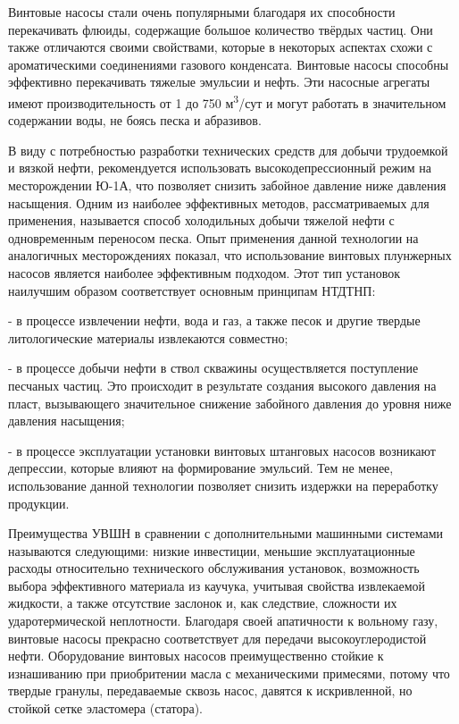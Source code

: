 \begin{multicols}{2}
Винтовые насосы стали очень популярными благодаря их способности
перекачивать флюиды, содержащие большое количество твёрдых частиц. Они
также отличаются своими свойствами, которые в некоторых аспектах схожи с
ароматическими соединениями газового конденсата. Винтовые насосы
способны эффективно перекачивать тяжелые эмульсии и нефть. Эти насосные
агрегаты имеют производительность от 1 до 750 м\textsuperscript{3}/сут и
могут работать в значительном содержании воды, не боясь песка и
абразивов.

В виду с потребностью разработки технических средств для добычи
трудоемкой и вязкой нефти, рекомендуется использовать
высокодепрессионный режим на месторождении Ю-1А, что позволяет снизить
забойное давление ниже давления насыщения. Одним из наиболее эффективных
методов, рассматриваемых для применения, называется способ холодильных
добычи тяжелой нефти с одновременным переносом песка. Опыт применения
данной технологии на аналогичных месторождениях показал, что
использование винтовых плунжерных насосов является наиболее эффективным
подходом. Этот тип установок наилучшим образом соответствует основным
принципам НТДТНП:

- в процессе извлечении нефти, вода и газ, а также песок и другие
твердые литологические материалы извлекаются совместно;

- в процессе добычи нефти в ствол скважины осуществляется поступление
песчаных частиц. Это происходит в результате создания высокого
давления на пласт, вызывающего значительное снижение забойного
давления до уровня ниже давления насыщения;

- в процессе эксплуатации установки винтовых штанговых насосов возникают
депрессии, которые влияют на формирование эмульсий. Тем не менее,
использование данной технологии позволяет снизить издержки на
переработку продукции.

Преимущества УВШН в сравнении с дополнительными машинными системами
называются следующими: низкие инвестиции, меньшие эксплуатационные
расходы относительно технического обслуживания установок, возможность
выбора эффективного материала из каучука, учитывая свойства извлекаемой
жидкости, а также отсутствие заслонок и, как следствие, сложности их
ударотермической неплотности. Благодаря своей апатичности к вольному
газу, винтовые насосы прекрасно соответствует для передачи
высокоуглеродистой нефти. Оборудование винтовых насосов преимущественно
стойкие к изнашиванию при приобритении масла с механическими примесями,
потому что твердые гранулы, передаваемые сквозь насос, давятся к
искривленной, но стойкой сетке эластомера (статора).


\end{multicols}

